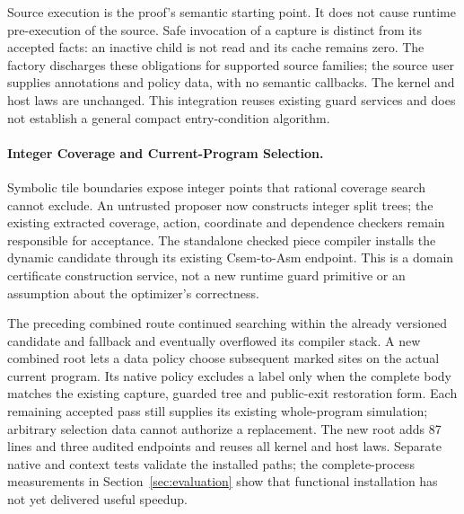 Source execution is the proof's semantic starting point. It does not cause
runtime pre-execution of the source. Safe invocation of a capture is distinct
from its accepted facts: an inactive child is not read and its cache remains
zero. The factory discharges these obligations for supported source families;
the source user supplies annotations and policy data, with no semantic callbacks.
The kernel and host laws are unchanged. This integration reuses existing guard
services and does not establish a general compact entry-condition algorithm.

\paragraph{Integer Coverage and Current-Program Selection.}
Symbolic tile boundaries expose integer points that rational coverage search
cannot exclude. An untrusted proposer now constructs integer split trees;
the existing extracted coverage, action, coordinate and dependence checkers
remain responsible for acceptance. The standalone checked piece compiler
installs the dynamic candidate through its existing Csem-to-Asm endpoint.
This is a domain certificate construction service, not a new runtime guard
primitive or an assumption about the optimizer's correctness.

The preceding combined route continued searching within the already versioned
candidate and fallback and eventually overflowed its compiler stack. A new
combined root lets a data policy choose subsequent marked sites on the actual
current program. Its native policy excludes a label only when the complete body
matches the existing capture, guarded tree and public-exit restoration form.
Each remaining accepted pass still supplies its existing whole-program
simulation; arbitrary selection data cannot authorize a replacement.
The new root adds 87 lines and three audited endpoints and reuses all kernel
and host laws. Separate native and context tests validate the installed paths;
the complete-process measurements in Section~\ref{sec:evaluation} show that
functional installation has not yet delivered useful speedup.
